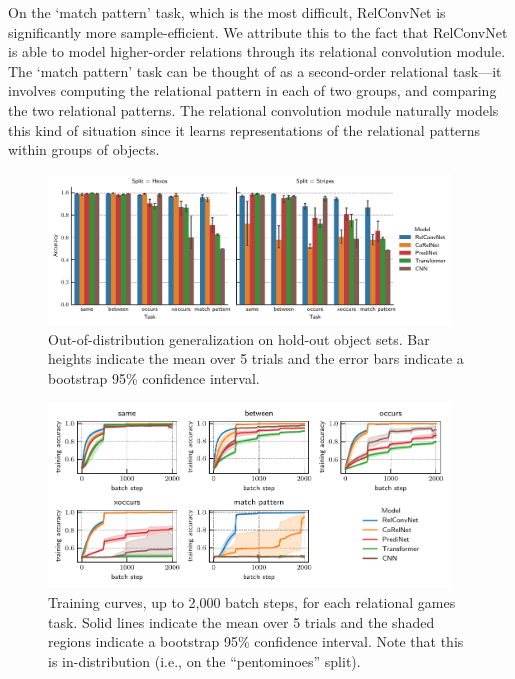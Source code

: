 On the `match pattern' task, which is the most difficult, RelConvNet is significantly more sample-efficient. We attribute this to the fact that RelConvNet is able to model higher-order relations through its relational convolution module. The `match pattern' task can be thought of as a second-order relational task---it involves computing the relational pattern in each of two groups, and comparing the two relational patterns. The relational convolution module naturally models this kind of situation since it learns representations of the relational patterns within groups of objects. %

\begin{figure}[t]
    \centering
    \includegraphics[width=0.95\textwidth]{figs/experiments/relgames_ood_acc.pdf}
    \caption{Out-of-distribution generalization on hold-out object sets. Bar heights indicate the mean over 5 trials and the error bars indicate a bootstrap 95\% confidence interval.}\label{fig:ood_generalization}
\end{figure}
\begin{figure}[t]
    \centering
    \includegraphics[width=0.95\textwidth]{figs/experiments/all_training_curves.pdf}
    \caption{Training curves, up to 2,000 batch steps, for each relational games task. Solid lines indicate the mean over 5 trials and the shaded regions indicate a bootstrap 95\% confidence interval. Note that this is in-distribution (i.e., on the ``pentominoes'' split).}\label{fig:training_curves}
\end{figure}

